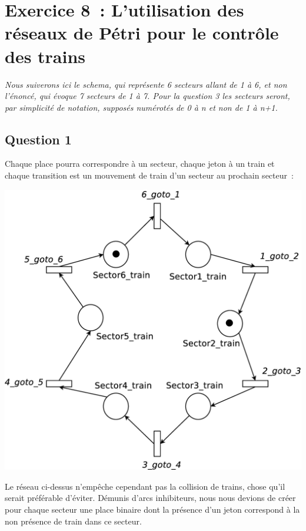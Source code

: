 \section*{Exercice 8~: L'utilisation des réseaux de Pétri pour le
  contrôle des trains}
  
\emph{Nous suiverons ici le schema, qui représente 6 secteurs allant
  de 1 à 6, et non l'énoncé, qui évoque 7 secteurs de 1 à 7. Pour la
  question 3 les secteurs seront, par simplicité de notation, supposés
  numérotés de 0 à n et non de 1 à n+1.}

\subsection*{Question 1}

Chaque place pourra correspondre à un secteur, chaque jeton à un train
et chaque transition est un mouvement de train d'un secteur au
prochain secteur~:

\begin{center}
\includegraphics[height = 0.3\paperwidth]{exo8_1.eps}
\end{center}

Le réseau ci-dessus n'empêche cependant pas la collision de trains,
chose qu'il serait préférable d'éviter. Démunis d'arcs inhibiteurs,
nous nous devions de créer pour chaque secteur une place binaire dont
la présence d'un jeton correspond à la non présence de train dans ce
secteur.

